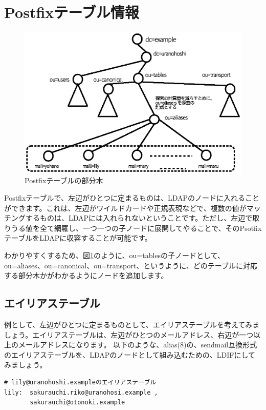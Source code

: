 \section{Postfixテーブル情報}

\begin{figure}[htbp]
	\includegraphics[width=12cm,clip]{draw/postfix_table.eps}
	\caption{Postfixテーブルの部分木}
	\label{fig:postfix_table}
\end{figure}

Postfixテーブルで、左辺がひとつに定まるものは、LDAPのノードに入れることができます。これは、左辺がワイルドカードや正規表現などで、複数の値がマッチングするものは、LDAPには入れられないということです。ただし、左辺で取りうる値を全て網羅し、一つ一つの子ノードに展開してやることで、そのPsotfixテーブルをLDAPに収容することが可能です。

わかりやすくするため、図\ref{fig:postfix_table}のように、ou=tablesの子ノードとして、ou=aliases、ou=canonical、ou=transport、というように、どのテーブルに対応する部分木かがわかるようにノードを追加します。


\subsection{エイリアステーブル}

例として、左辺がひとつに定まるものとして、エイリアステーブルを考えてみましょう。エイリアステーブルは、左辺がひとつのメールアドレス、右辺が一つ以上のメールアドレスになります。
以下のような、alias(8)の、sendmail互換形式のエイリアステーブルを、LDAPのノードとして組み込むための、LDIFにしてみましょう。

\begin{verbatim}
# lily@uranohoshi.exampleのエイリアステーブル
lily:  sakurauchi.riko@uranohosi.example , 
       sakurauchi@otonoki.example
\end{verbatim}

